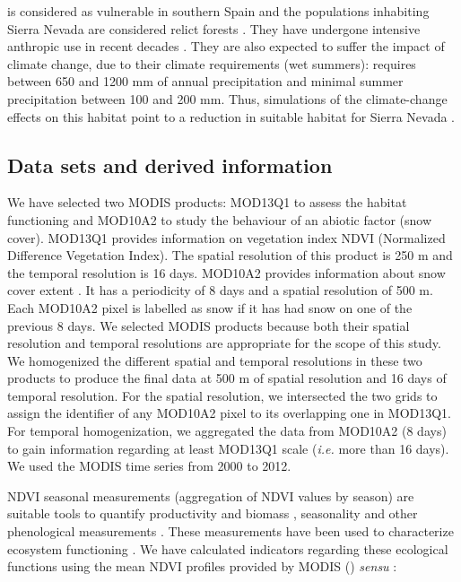 \Qpy is considered as vulnerable in southern Spain \autocite{Viveroetal2000QuercusPyrenaica} and the populations inhabiting Sierra Nevada are considered relict forests \autocite{MelendoValle2000EstudioComparativo}. They have undergone intensive anthropic use in recent decades \autocite{CamachoOlmedoetal2002AltaAlpujarra}. They are also expected to suffer the impact of climate change, due to their climate requirements (wet summers): \Qpy requires between 650 and 1200 mm of annual precipitation and minimal summer precipitation between 100 and 200 mm. Thus, simulations of the climate-change effects on this habitat point to a reduction in suitable habitat for Sierra Nevada \autocite{Benito2009EcoinformaticaAplicada,Benitoetal2011SimulatingPotential}.

\subsection{Data sets and derived information}\label{sec:onto:Data}

We have selected two MODIS products: MOD13Q1 to assess the habitat functioning and MOD10A2 to study the behaviour of an abiotic factor (snow cover). MOD13Q1 provides information on vegetation index NDVI (Normalized Difference Vegetation Index). The spatial resolution of this product is 250 m and the temporal resolution is 16 days. MOD10A2 provides information about snow cover extent \autocite{Halletal2002MODISSnowcover}. It has a periodicity of 8 days and a spatial resolution of 500 m. Each MOD10A2 pixel is labelled as snow if it has had snow on one of the previous 8 days. We selected MODIS products because both their spatial resolution and temporal resolutions are appropriate for the scope of this study.
We homogenized the different spatial and temporal resolutions in these two products to produce the final data at 500 m of spatial resolution and 16 days of temporal resolution. For the spatial resolution, we intersected the two grids to assign the identifier of any MOD10A2 pixel to its overlapping one in MOD13Q1. For temporal homogenization, we aggregated the data from MOD10A2 (8 days) to gain information regarding at least MOD13Q1 scale (\emph{i.e.} more than 16 days). We used the MODIS time series from 2000 to 2012.

NDVI seasonal measurements (aggregation of NDVI values by season) are suitable tools to quantify productivity and biomass \autocite{Runningetal2004ContinuousSatelliteDerived,Turneretal2006EvaluationMODIS}, seasonality \autocite{Pineiroetal2006SeasonalVariation, PotterBrooks1998GlobalAnalysis} and other phenological measurements \autocite{Clelandetal2007ShiftingPlant}. These measurements have been used to characterize ecosystem functioning \autocite{Cabelloetal2012EcosystemFunctioning}. We have calculated indicators regarding these ecological functions using the mean NDVI profiles provided by MODIS () \emph{sensu} \textcite{AlcarazSeguraetal2009BaselineCharacterization}:

